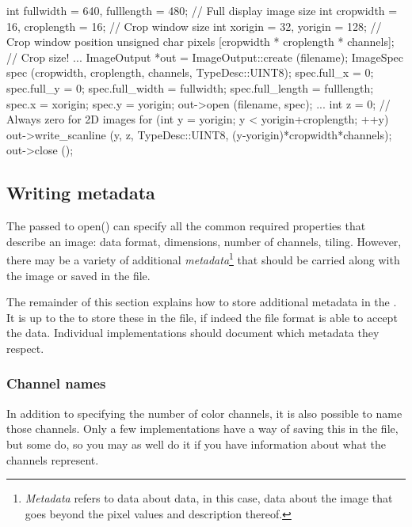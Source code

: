 \begin{code}
        int fullwidth = 640, fulllength = 480; // Full display image size
        int cropwidth = 16, croplength = 16;  // Crop window size
        int xorigin = 32, yorigin = 128;      // Crop window position
        unsigned char pixels [cropwidth * croplength * channels]; // Crop size!
        ...
        ImageOutput *out = ImageOutput::create (filename);
        ImageSpec spec (cropwidth, croplength, channels, TypeDesc::UINT8);
        spec.full_x = 0;
        spec.full_y = 0;
        spec.full_width = fullwidth;
        spec.full_length = fulllength;
        spec.x = xorigin;
        spec.y = yorigin;
        out->open (filename, spec);
        ...
        int z = 0;   // Always zero for 2D images
        for (int y = yorigin;  y < yorigin+croplength;  ++y) {
            out->write_scanline (y, z, TypeDesc::UINT8, (y-yorigin)*cropwidth*channels);
        }
        out->close ();
\end{code}


\subsection{Writing metadata}
\label{sec:imageoutput:metadata}

The \ImageSpec passed to {\cf open()} can specify all the common
required properties that describe an image: data format, dimensions,
number of channels, tiling.  However, there may be a variety of
additional \emph{metadata}\footnote{\emph{Metadata} refers to data about
data, in this case, data about the image that goes beyond the pixel
values and description thereof.} that should be carried along with the
image or saved in the file.  

The remainder of this section explains how to store additional metadata
in the \ImageSpec.  It is up to the \ImageOutput to store these
in the file, if indeed the file format is able to accept the data.
Individual \ImageOutput implementations should document which metadata
they respect.

\subsubsection{Channel names}

In addition to specifying the number of color channels, it is also
possible to name those channels.  Only a few \ImageOutput
implementations have a way of saving this in the file, but some do, so
you may as well do it if you have information about what the channels
represent.

